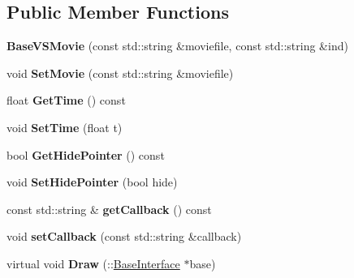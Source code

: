 \subsection*{Public Member Functions}
\begin{DoxyCompactItemize}
\item 
{\bfseries Base\+V\+S\+Movie} (const std\+::string \&moviefile, const std\+::string \&ind)\hypertarget{classBaseInterface_1_1Room_1_1BaseVSMovie_ad955a4ad3038ebdc4c263cc96f520b49}{}\label{classBaseInterface_1_1Room_1_1BaseVSMovie_ad955a4ad3038ebdc4c263cc96f520b49}

\item 
void {\bfseries Set\+Movie} (const std\+::string \&moviefile)\hypertarget{classBaseInterface_1_1Room_1_1BaseVSMovie_ae098f4bfb71e8444ad3fa3bdde657062}{}\label{classBaseInterface_1_1Room_1_1BaseVSMovie_ae098f4bfb71e8444ad3fa3bdde657062}

\item 
float {\bfseries Get\+Time} () const \hypertarget{classBaseInterface_1_1Room_1_1BaseVSMovie_a075bd23166a74cbec2a8b170b89fbbf8}{}\label{classBaseInterface_1_1Room_1_1BaseVSMovie_a075bd23166a74cbec2a8b170b89fbbf8}

\item 
void {\bfseries Set\+Time} (float t)\hypertarget{classBaseInterface_1_1Room_1_1BaseVSMovie_a14cbd0dc39f3fc7a8677e80a6ad8ec78}{}\label{classBaseInterface_1_1Room_1_1BaseVSMovie_a14cbd0dc39f3fc7a8677e80a6ad8ec78}

\item 
bool {\bfseries Get\+Hide\+Pointer} () const \hypertarget{classBaseInterface_1_1Room_1_1BaseVSMovie_aac6ff179e31af42fb8bebaa456253b11}{}\label{classBaseInterface_1_1Room_1_1BaseVSMovie_aac6ff179e31af42fb8bebaa456253b11}

\item 
void {\bfseries Set\+Hide\+Pointer} (bool hide)\hypertarget{classBaseInterface_1_1Room_1_1BaseVSMovie_aee6dad8f73309f4b93e99179117d82b9}{}\label{classBaseInterface_1_1Room_1_1BaseVSMovie_aee6dad8f73309f4b93e99179117d82b9}

\item 
const std\+::string \& {\bfseries get\+Callback} () const \hypertarget{classBaseInterface_1_1Room_1_1BaseVSMovie_a9f671283e3aa88977411f28ff3a9422b}{}\label{classBaseInterface_1_1Room_1_1BaseVSMovie_a9f671283e3aa88977411f28ff3a9422b}

\item 
void {\bfseries set\+Callback} (const std\+::string \&callback)\hypertarget{classBaseInterface_1_1Room_1_1BaseVSMovie_acdf90f9e7d1aa5b7ad08e4e733d6a72b}{}\label{classBaseInterface_1_1Room_1_1BaseVSMovie_acdf90f9e7d1aa5b7ad08e4e733d6a72b}

\item 
virtual void {\bfseries Draw} (\+::\hyperlink{classBaseInterface}{Base\+Interface} $\ast$base)\hypertarget{classBaseInterface_1_1Room_1_1BaseVSMovie_a5000706f38be20ebf0adc7f2970a9c39}{}\label{classBaseInterface_1_1Room_1_1BaseVSMovie_a5000706f38be20ebf0adc7f2970a9c39}

\end{DoxyCompactItemize}
